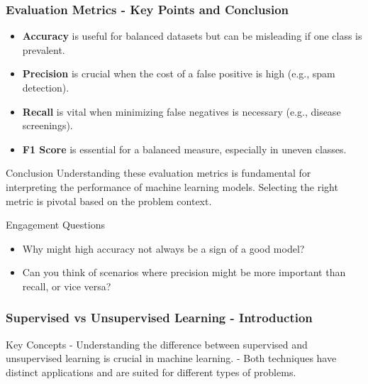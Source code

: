 \documentclass[aspectratio=169]{beamer}
\begin{document}
\begin{frame}[fragile]
    \frametitle{Evaluation Metrics - Key Points and Conclusion}
    \begin{itemize}
        \item \textbf{Accuracy} is useful for balanced datasets but can be misleading if one class is prevalent.
        \item \textbf{Precision} is crucial when the cost of a false positive is high (e.g., spam detection).
        \item \textbf{Recall} is vital when minimizing false negatives is necessary (e.g., disease screenings).
        \item \textbf{F1 Score} is essential for a balanced measure, especially in uneven classes.
    \end{itemize}

    \begin{block}{Conclusion}
        Understanding these evaluation metrics is fundamental for interpreting the performance of machine learning models. Selecting the right metric is pivotal based on the problem context.
    \end{block}
    
    \begin{block}{Engagement Questions}
        \begin{itemize}
            \item Why might high accuracy not always be a sign of a good model?
            \item Can you think of scenarios where precision might be more important than recall, or vice versa?
        \end{itemize}
    \end{block}
\end{frame}

\begin{frame}[fragile]
    \frametitle{Supervised vs Unsupervised Learning - Introduction}
    \begin{block}{Key Concepts}
        - Understanding the difference between supervised and unsupervised learning is crucial in machine learning.
        - Both techniques have distinct applications and are suited for different types of problems.
    \end{block}
\end{frame}
\end{document}
